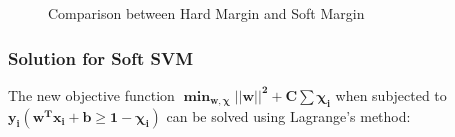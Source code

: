 \documentclass[11pt]{article}
\begin{document}
\setlength{\fboxsep}{1.3pt}%
\setlength{\fboxrule}{1pt}%
\begin{figure}[h]
    \centering
    \qquad
    \caption{Comparison between Hard Margin and Soft Margin}%
    \label{fig:SoftMarginsvsHardMargins}%
\end{figure}

\subsubsection{\textbf{Solution for Soft SVM}}

The new objective function $\mathbf{\min_{w, \chi}{||w||^2}+C\sum{\chi_i}}$ when subjected to $\mathbf{y_i(w^{T}x_{i}+b \geq 1-\chi_i)}$ can be solved using Lagrange's method:
\end{document}
